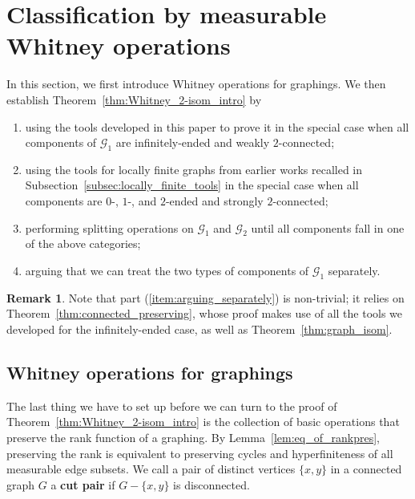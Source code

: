 \documentclass{article}
\theoremstyle{plain}
\theoremstyle{definition}
\newtheorem{rem}[thm]{Remark}
\newcommand{\cG}{\mathcal{G}}
\begin{document}

\section{Classification by measurable Whitney operations}
\label{sec:general_Whitney_for_graphings}
In this section, we first introduce Whitney operations for graphings. We then establish Theorem~\ref{thm:Whitney_2-isom_intro} by 

\begin{enumerate}
    \item using the tools developed in this paper to prove it in the special case when all components of $\cG_1$ are infinitely-ended and weakly $2$-connected; 

    \item using the tools for locally finite graphs from earlier works recalled in Subsection~\ref{subsec:locally_finite_tools} in the special case when all components are $0$-, $1$-, and $2$-ended and strongly $2$-connected;

    \item performing splitting operations on $\cG_1$ and $\cG_2$ until all components fall in one of the above categories;
    
    \item \label{item:arguing_separately} arguing that we can treat the two types of components of $\cG_1$ separately. 
    
\end{enumerate}
\begin{rem}
Note that part (\ref{item:arguing_separately}) is non-trivial; it relies on Theorem~\ref{thm:connected_preserving}, whose proof makes use of all the tools we developed for the infinitely-ended case, as well as Theorem~\ref{thm:graph_isom}.
\end{rem}

\subsection{Whitney operations for graphings} \label{subsec:whitney_operations}

The last thing we have to set up before we can turn to the proof of Theorem~\ref{thm:Whitney_2-isom_intro} is the collection of basic operations that preserve the rank function of a graphing. By Lemma~\ref{lem:eq_of_rankpres}, preserving the rank is equivalent to preserving cycles and hyperfiniteness of all measurable edge subsets. We call a pair of distinct vertices $\{x,y\}$ in a connected graph $G$ a {\bf cut pair} if $G-\{x,y\}$ is disconnected.
\end{document}
